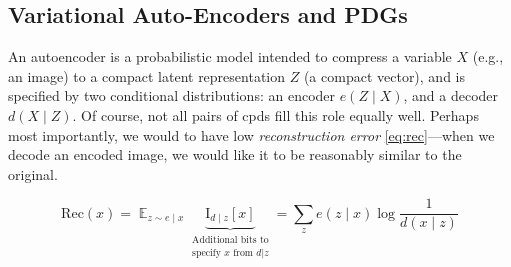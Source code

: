 \documentclass{article}
\makeatletter
\theoremstyle{plain}
\theoremstyle{definition}
\let\H\relax
\DeclareMathOperator{\H}{\mathrm{H}} %
\DeclareMathOperator*{\Ex}{\mathbb{E}} %
\newcommand{\datadist}[1]{\Pr\nolimits_{#1}}
\newcommand\Inc{\mathit{Inc}}
\newcommand\aar{\@ifstar\aar@resize\aar@plain}
\newcommand\aar@resize[1]{\scaleleftright[3.8ex]{\Biggl\langle\!\!\!\!\Biggl\langle}{#1}
		{\Biggr\rangle\!\!\!\!\Biggr\rangle}}
\makeatother
\begin{document}


\subsection{Variational Auto-Encoders and PDGs}

An autoencoder is a probabilistic model intended to compress a variable $X$ (e.g., an image) to a compact latent representation $Z$ (a compact vector), and is specified by two conditional distributions:
an encoder $e(Z \mid X)$, and a decoder $d(X \mid Z)$.
Of course, not all pairs of cpds fill this role equally well.
Perhaps most importantly, we would to have low \emph{reconstruction error} \eqref{eq:rec}---when we decode an encoded image, we would like it to be reasonably similar to the original.

\begin{equation}
 \mathrm{Rec}(x) = \Ex_{z \sim e \mid x} \underbrace{\mathrm I_{d\mid z}[x]}_{\substack{\text{Additional bits to}\\\text{specify $x$ from $d|z$}}}
	= \sum_z e(z \mid x) \log \frac1{d(x \mid z)}\label{eq:rec}
\end{equation}
\end{document}
